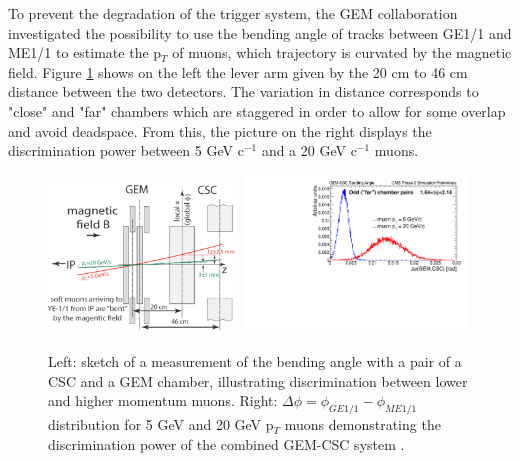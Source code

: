     To prevent the degradation of the trigger system, the GEM collaboration investigated the possibility to use the bending angle of tracks between GE1/1 and ME1/1 to estimate the p$_T$ of muons, which trajectory is curvated by the magnetic field. Figure \ref{fig:II-1-csc-bending} shows on the left the lever arm given by the 20 cm to 46 cm distance between the two detectors. The variation in distance corresponds to "close" and "far" chambers which are staggered in order to allow for some overlap and avoid deadspace. From this, the picture on the right displays the discrimination power between 5 GeV c$^{-1}$ and a 20 GeV c$^{-1}$ muons. \\

    \begin{figure}[h!]
      \centering
      \includegraphics[width=0.45\textwidth]{img/II-1-gem/gem-csc-bending-1.png}
      \includegraphics[width=0.53\textwidth]{img/II-1-gem/gem-csc-bending-2.pdf}
      \caption{Left: sketch of a measurement of the bending angle with a pair of a CSC and a GEM chamber, illustrating discrimination between lower and higher momentum muons. Right: $ \Delta \phi = \phi_{GE1/1} - \phi_{ME1/1} $ distribution for 5 GeV and 20 GeV p$_T$ muons demonstrating the discrimination power of the combined GEM-CSC system \cite{Colaleo:2021453}.}
      \label{fig:II-1-csc-bending}
    \end{figure}

